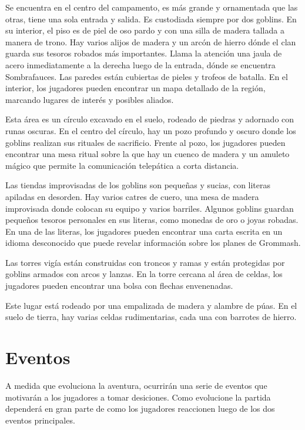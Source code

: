 \documentclass[10pt,twoside,twocolumn,openany]{dndbook}
\begin{document}
Se encuentra en el centro del campamento, es más grande y ornamentada que las otras, tiene una sola 
entrada y salida. Es custodiada siempre por dos goblins. En su interior, el piso es de piel de oso pardo 
y con una silla de madera tallada a manera de trono. Hay varios alijos de madera y un arcón de hierro 
dónde el clan guarda sus tesoros robados más importantes. Llama la atención una jaula de acero 
inmediatamente a la derecha luego de la entrada, dónde se encuentra Sombrafauces. Las paredes están 
cubiertas de pieles y trofeos de batalla. En el interior, los jugadores pueden encontrar un mapa 
detallado de la región, marcando lugares de interés y posibles aliados.

Esta área es un círculo excavado en el suelo, rodeado de piedras y adornado con runas oscuras. En el 
centro del círculo, hay un pozo profundo y oscuro donde los goblins realizan sus rituales de sacrificio.
Frente al pozo, los jugadores pueden encontrar una mesa ritual sobre la que hay un cuenco de madera y un
amuleto mágico que permite la comunicación telepática a corta distancia.

Las tiendas improvisadas de los goblins son pequeñas y sucias, con literas apiladas en desorden. Hay 
varios catres de cuero, una mesa de madera improvisada donde colocan su equipo y varios barriles. 
Algunos goblins guardan pequeños tesoros personales en sus literas, como monedas de oro o joyas robadas.
En una de las literas, los jugadores pueden encontrar una carta escrita en un idioma desconocido que 
puede revelar información sobre los planes de Grommash.

Las torres vigía están construidas con troncos y ramas y están protegidas por goblins armados con arcos 
y lanzas. En la torre cercana al área de celdas, los jugadores pueden encontrar una bolsa con flechas 
envenenadas.

Este lugar está rodeado por una empalizada de madera y alambre de púas. En el suelo de tierra, hay 
varias celdas rudimentarias, cada una con barrotes de hierro. 

\section{Eventos}
A medida que evoluciona la aventura, ocurrirán una serie de eventos que motivarán a los jugadores a 
tomar desiciones. Como evolucione la partida dependerá en gran parte de como los jugadores reaccionen 
luego de los dos eventos principales.
\end{document}
